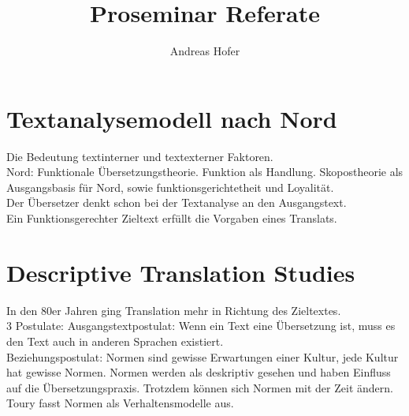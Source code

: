 \documentclass{article}
\title{Proseminar Referate}
\author{Andreas Hofer}
\begin{document}
	\maketitle
	\section{Textanalysemodell nach Nord}
	Die Bedeutung textinterner und textexterner Faktoren. \\
	Nord: Funktionale Übersetzungstheorie. Funktion als Handlung. Skopostheorie als Ausgangsbasis für Nord, sowie funktionsgerichtetheit und Loyalität. \\
	Der Übersetzer denkt schon bei der Textanalyse an den Ausgangstext. \\
	Ein Funktionsgerechter Zieltext erfüllt die Vorgaben eines Translats. \\
	\section{Descriptive Translation Studies}
	In den 80er Jahren ging Translation mehr in Richtung des Zieltextes. \\
	3 Postulate: 
	Ausgangstextpostulat: Wenn ein Text eine Übersetzung ist, muss es den Text auch in anderen Sprachen existiert. \\
	Beziehungspostulat: 
	Normen sind gewisse Erwartungen einer Kultur, jede Kultur hat gewisse Normen. Normen werden als deskriptiv gesehen und haben Einfluss auf die Übersetzungspraxis. Trotzdem können sich Normen mit der Zeit ändern. Toury fasst Normen als Verhaltensmodelle aus.
\end{document}
